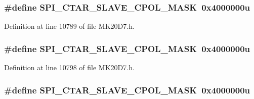 \subsubsection[{\texorpdfstring{S\+P\+I\+\_\+\+C\+T\+A\+R\+\_\+\+S\+L\+A\+V\+E\+\_\+\+C\+P\+O\+L\+\_\+\+M\+A\+SK}{SPI_CTAR_SLAVE_CPOL_MASK}}]{\setlength{\rightskip}{0pt plus 5cm}\#define S\+P\+I\+\_\+\+C\+T\+A\+R\+\_\+\+S\+L\+A\+V\+E\+\_\+\+C\+P\+O\+L\+\_\+\+M\+A\+SK~0x4000000u}\hypertarget{group___s_p_i___register___masks_ga57c0bdc9ff5183b0e8da776a8d803ff1}{}\label{group___s_p_i___register___masks_ga57c0bdc9ff5183b0e8da776a8d803ff1}


Definition at line 10789 of file M\+K20\+D7.\+h.

\subsubsection[{\texorpdfstring{S\+P\+I\+\_\+\+C\+T\+A\+R\+\_\+\+S\+L\+A\+V\+E\+\_\+\+C\+P\+O\+L\+\_\+\+M\+A\+SK}{SPI_CTAR_SLAVE_CPOL_MASK}}]{\setlength{\rightskip}{0pt plus 5cm}\#define S\+P\+I\+\_\+\+C\+T\+A\+R\+\_\+\+S\+L\+A\+V\+E\+\_\+\+C\+P\+O\+L\+\_\+\+M\+A\+SK~0x4000000u}\hypertarget{group___s_p_i___register___masks_ga57c0bdc9ff5183b0e8da776a8d803ff1}{}\label{group___s_p_i___register___masks_ga57c0bdc9ff5183b0e8da776a8d803ff1}


Definition at line 10798 of file M\+K20\+D7.\+h.

\subsubsection[{\texorpdfstring{S\+P\+I\+\_\+\+C\+T\+A\+R\+\_\+\+S\+L\+A\+V\+E\+\_\+\+C\+P\+O\+L\+\_\+\+M\+A\+SK}{SPI_CTAR_SLAVE_CPOL_MASK}}]{\setlength{\rightskip}{0pt plus 5cm}\#define S\+P\+I\+\_\+\+C\+T\+A\+R\+\_\+\+S\+L\+A\+V\+E\+\_\+\+C\+P\+O\+L\+\_\+\+M\+A\+SK~0x4000000u}\hypertarget{group___s_p_i___register___masks_ga57c0bdc9ff5183b0e8da776a8d803ff1}{}\label{group___s_p_i___register___masks_ga57c0bdc9ff5183b0e8da776a8d803ff1}


